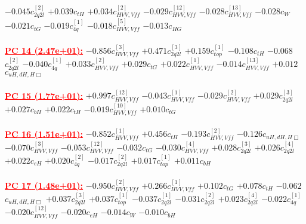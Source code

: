 \documentclass{article}
\begin{document}
{$-0.045$}{\rm $c_{2q2l}^{[2]}$} 
{$+0.039$}{\rm $c_{tH}$} 
{$+0.034$}{\rm $c_{HVV,Vff}^{[2]}$} 
{$-0.029$}{\rm $c_{HVV,Vff}^{[12]}$} 
{$-0.028$}{\rm $c_{HVV,Vff}^{[13]}$} 
{$-0.028$}{\rm $c_{W}$} 
{$-0.021$}{\rm $c_{tG}$} 
{$-0.019$}{\rm $c_{4q}^{[1]}$} 
{$-0.018$}{\rm $c_{HVV,Vff}^{[5]}$} 
{$-0.013$}{\rm $c_{HG}$} 
 \nonumber \\ \nonumber \\ 
\noindent \textcolor{red}{\underline{\bf{PC 14} (2.47e+01):}}
{$-0.856$}{\rm $c_{HVV,Vff}^{[3]}$} 
{$+0.471$}{\rm $c_{2q2l}^{[3]}$} 
{$+0.159$}{\rm $c_{top}^{[1]}$} 
{$-0.108$}{\rm $c_{tH}$} 
{$-0.068$}{\rm $c_{2q2l}^{[2]}$} 
{$-0.040$}{\rm $c_{4q}^{[1]}$} 
{$+0.033$}{\rm $c_{HVV,Vff}^{[2]}$} 
{$+0.029$}{\rm $c_{tG}$} 
{$+0.022$}{\rm $c_{HVV,Vff}^{[1]}$} 
{$-0.014$}{\rm $c_{HVV,Vff}^{[13]}$} 
{$+0.012$}{\rm $c_{uH,dH,H\Box}$} 
 \nonumber \\ \nonumber \\ 
\noindent \textcolor{red}{\underline{\bf{PC 15} (1.77e+01):}}
{$+0.997$}{\rm $c_{HVV,Vff}^{[12]}$} 
{$-0.043$}{\rm $c_{HVV,Vff}^{[1]}$} 
{$-0.029$}{\rm $c_{HVV,Vff}^{[2]}$} 
{$+0.029$}{\rm $c_{2q2l}^{[3]}$} 
{$+0.027$}{\rm $c_{bH}$} 
{$+0.022$}{\rm $c_{tH}$} 
{$-0.019$}{\rm $c_{HVV,Vff}^{[10]}$} 
{$+0.010$}{\rm $c_{tG}$} 
 \nonumber \\ \nonumber \\ 
\noindent \textcolor{red}{\underline{\bf{PC 16} (1.51e+01):}}
{$-0.852$}{\rm $c_{HVV,Vff}^{[1]}$} 
{$+0.456$}{\rm $c_{tH}$} 
{$-0.193$}{\rm $c_{HVV,Vff}^{[2]}$} 
{$-0.126$}{\rm $c_{uH,dH,H\Box}$} 
{$-0.070$}{\rm $c_{HVV,Vff}^{[3]}$} 
{$-0.053$}{\rm $c_{HVV,Vff}^{[12]}$} 
{$-0.032$}{\rm $c_{tG}$} 
{$-0.030$}{\rm $c_{HVV,Vff}^{[4]}$} 
{$+0.028$}{\rm $c_{2q2l}^{[3]}$} 
{$+0.026$}{\rm $c_{2q2l}^{[4]}$} 
{$+0.022$}{\rm $c_{eH}$} 
{$+0.020$}{\rm $c_{4q}^{[2]}$} 
{$-0.017$}{\rm $c_{2q2l}^{[2]}$} 
{$+0.017$}{\rm $c_{top}^{[1]}$} 
{$+0.011$}{\rm $c_{bH}$} 
 \nonumber \\ \nonumber \\ 
\noindent \textcolor{red}{\underline{\bf{PC 17} (1.48e+01):}}
{$-0.950$}{\rm $c_{HVV,Vff}^{[2]}$} 
{$+0.266$}{\rm $c_{HVV,Vff}^{[1]}$} 
{$+0.102$}{\rm $c_{tG}$} 
{$+0.078$}{\rm $c_{tH}$} 
{$-0.062$}{\rm $c_{uH,dH,H\Box}$} 
{$+0.037$}{\rm $c_{2q2l}^{[3]}$} 
{$+0.037$}{\rm $c_{top}^{[1]}$} 
{$-0.037$}{\rm $c_{2q2l}^{[1]}$} 
{$-0.031$}{\rm $c_{2q2l}^{[2]}$} 
{$+0.023$}{\rm $c_{2q2l}^{[4]}$} 
{$-0.022$}{\rm $c_{4q}^{[1]}$} 
{$-0.020$}{\rm $c_{HVV,Vff}^{[12]}$} 
{$-0.020$}{\rm $c_{eH}$} 
{$-0.014$}{\rm $c_{W}$} 
{$-0.010$}{\rm $c_{bH}$} 
 \nonumber \\ \nonumber \\ 
\end{document}
